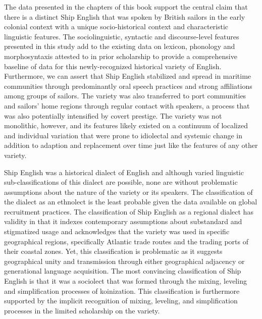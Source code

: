 \documentclass[12pt]{article}
\newcommand\textstylereferencetext[1]{#1}
\newenvironment{styleStandard}{\renewcommand\baselinestretch{1.0}\setlength\leftskip{0cm}\setlength\rightskip{0cm plus 1fil}\setlength\parindent{0cm}\setlength\parfillskip{0pt plus 1fil}\setlength\parskip{0in plus 1pt}\writerlistparindent\writerlistleftskip\leavevmode\normalfont\normalsize\writerlistlabel\ignorespaces}{\unskip\vspace{0in plus 1pt}\par}
\newcommand\writerlistleftskip{}
\newcommand\writerlistparindent{}
\newcommand\writerlistlabel{}
\begin{document}
\begin{styleStandard}
The data presented in the chapters of this book support the central claim that there is a distinct Ship English that was spoken by British sailors in the early colonial context with a unique socio-historical context and characteristic linguistic features. The sociolinguistic, syntactic and discourse-level features presented in this study add to the existing data on lexicon, phonology and morphosyntaxis attested to in prior scholarship to provide a comprehensive baseline of data for this newly-recognized historical variety of English. Furthermore, we can assert that Ship English stabilized and spread in maritime communities through predominantly oral speech practices and strong affiliations among groups of sailors. The variety was also transferred to port communities and sailors’ home regions through regular contact with speakers, a process that was also potentially intensified by covert prestige. The variety was not monolithic, however, and its features likely existed on a continuum of localized and individual variation that were prone to idiolectal and systemic change in addition to adaption and replacement over time just like the features of any other variety. 
\end{styleStandard}


\begin{styleStandard}
Ship English was a historical dialect of English and although varied linguistic sub-classifications of this dialect are possible, none are without problematic assumptions about the nature of the variety or its speakers. The classification of the dialect as an ethnolect is the least probable given the data available on global recruitment practices. The classification of Ship English as a regional dialect has validity in that it indexes contemporary assumptions about \textstylereferencetext{substandard and stigmatized usage and acknowledges that the variety was used in specific geographical regions, specifically Atlantic trade routes} and the trading ports of their coastal zones. \textstylereferencetext{Yet, this classification }is problematic\textstylereferencetext{ as it suggests }geographical unity and transmission through either geographical adjacency or generational language acquisition. The most convincing classification of Ship English is that it was a sociolect that was formed through the mixing, leveling and simplification processes of koinization. This classification is furthermore supported by the implicit recognition of mixing, leveling, and simplification processes in the limited scholarship on the variety.
\end{styleStandard}
\end{document}
